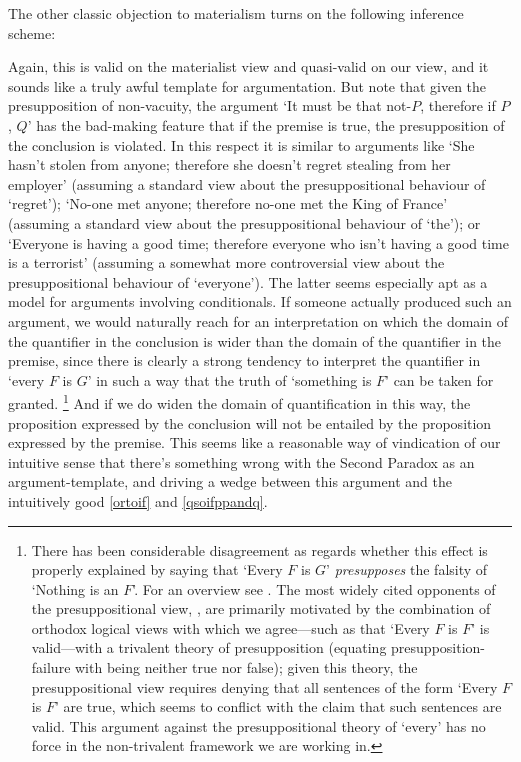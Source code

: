 \documentclass[If.tex]{subfiles}
\begin{document}
The other classic objection to materialism turns on the following inference scheme:
\begin{prop}
\end{prop}
Again, this is valid on the materialist view and quasi-valid on our view, and it sounds like a truly awful template for argumentation. But note that given the presupposition of non-vacuity, the argument ‘It must be that not-$P$, therefore if $P$, $Q$’ has the bad-making feature that if the premise is true, the presupposition of the conclusion is violated. In this respect it is similar to arguments like ‘She hasn't stolen from anyone; therefore she doesn't regret stealing from her employer’ (assuming a standard view about the presuppositional behaviour of ‘regret’); ‘No-one met anyone; therefore no-one met the King of France’ (assuming a standard view about the presuppositional behaviour of ‘the’); or ‘Everyone is having a good time; therefore everyone who isn't having a good time is a terrorist’ (assuming a somewhat more controversial view about the presuppositional behaviour of ‘everyone’). The latter seems especially apt as a model for arguments involving conditionals.  If someone actually produced such an argument, we would naturally reach for an interpretation on which the domain of the quantifier in the conclusion is wider than the domain of the quantifier in the premise, since there is clearly a strong tendency to interpret the quantifier in ‘every $F$ is $G$’ in such a way that the truth of ‘something is $F$’ can be taken for granted.%
\footnote{There has been considerable disagreement as regards whether this effect is properly explained by saying that ‘Every $F$ is $G$’ \emph{presupposes} the falsity of ‘Nothing is an $F$’.  For an overview see \cite[§6.8.2]{HeimKratzerSGG}.  The most widely cited opponents of the presuppositional view, \citet{LappinReinhartPESD}, are primarily motivated by the combination of orthodox logical views with which we agree---such as that ‘Every $F$ is $F$’ is valid---with a trivalent theory of presupposition (equating presupposition-failure with being neither true nor false); given this theory, the presuppositional view requires denying that all sentences of the form ‘Every $F$ is $F$’ are true, which seems to conflict with the claim that such sentences are valid.  This argument against the presuppositional theory of ‘every’ has no force in the non-trivalent framework we are working in.}
And if we do widen the domain of quantification in this way, the proposition expressed by the conclusion will not be entailed by the proposition expressed by the premise.  This seems like a reasonable way of vindication of our intuitive sense that there's something wrong with the Second Paradox as an argument-template, and driving a wedge between this argument and the intuitively good \ref{ortoif} and \ref{qsoifppandq}.%
\end{document}
